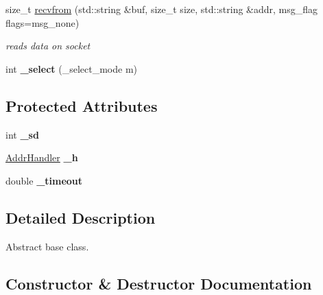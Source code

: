 \begin{CompactItemize}
\begin{CompactItemize}
size\_\-t \hyperlink{classsocketpp_1_1BaseSocket_8ba6376183fbcce5266775ecc1749e0a}{recvfrom} (std::string \&buf, size\_\-t size, std::string \&addr, msg\_\-flag flags=msg\_\-none)
\begin{CompactList}\small\item\em reads data on socket \item\end{CompactList}\item 
\hypertarget{classsocketpp_1_1BaseSocket_9c925091102c9371be9990fedd605f1c}{
int \textbf{\_\-select} (\_\-select\_\-mode m)}
\label{classsocketpp_1_1BaseSocket_9c925091102c9371be9990fedd605f1c}

\end{CompactItemize}
\subsection*{Protected Attributes}
\begin{CompactItemize}
\item 
\hypertarget{classsocketpp_1_1BaseSocket_a5ef6b5fabb3988bced6a23d9631985d}{
int \textbf{\_\-sd}}
\label{classsocketpp_1_1BaseSocket_a5ef6b5fabb3988bced6a23d9631985d}

\item 
\hypertarget{classsocketpp_1_1BaseSocket_1e44e3c6c2ecd89c2aa716cc62528620}{
\hyperlink{classsocketpp_1_1AddrHandler}{AddrHandler} \textbf{\_\-h}}
\label{classsocketpp_1_1BaseSocket_1e44e3c6c2ecd89c2aa716cc62528620}

\item 
\hypertarget{classsocketpp_1_1BaseSocket_418af5a1fe752cef38e4c6679780224c}{
double \textbf{\_\-timeout}}
\label{classsocketpp_1_1BaseSocket_418af5a1fe752cef38e4c6679780224c}

\end{CompactItemize}


\subsection{Detailed Description}
Abstract base class. 

\subsection{Constructor \& Destructor Documentation}
\hypertarget{classsocketpp_1_1BaseSocket_35c982d7aef2041c100439cf38aa7f4d}{
}
\end{CompactItemize}
